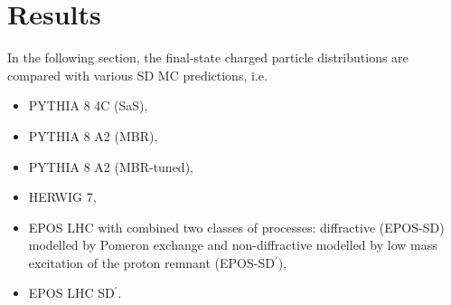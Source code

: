 \chapter{Results}\label{section:star_results}
In the following section, the  final-state charged particle distributions are compared with various  SD MC predictions, i.e. 
\begin{itemize}
	\item PYTHIA 8 4C (SaS),
	\item PYTHIA 8 A2 (MBR),
	\item PYTHIA 8 A2 (MBR-tuned),
	\item HERWIG 7,
	\item EPOS LHC with combined two classes of processes: diffractive (EPOS-SD) modelled by Pomeron exchange and non-diffractive modelled by low mass excitation of the proton remnant (EPOS-SD$^\prime$),
	\item EPOS LHC SD$^\prime$.
\end{itemize}

